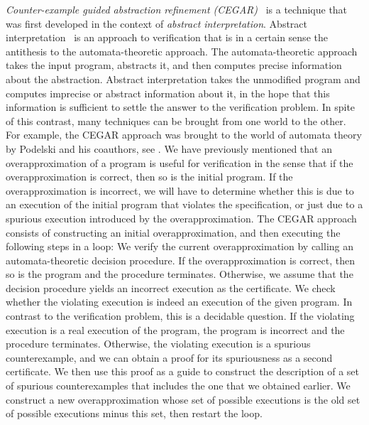 \documentclass[../../diss.tex]{subfiles}
\begin{document}
\emph{Counter-example guided abstraction refinement (CEGAR)}~\cite{ClarkeGJLV00} is a technique that was first developed in the context of \emph{abstract interpretation}.
Abstract interpretation~\cite{CousotC77} is an approach to verification that is in a certain sense the antithesis to the automata-theoretic approach.
The automata-theoretic approach takes the input program, abstracts it, and then computes precise information about the abstraction.
Abstract interpretation takes the unmodified program and computes imprecise or abstract information about it, in the hope that this information is sufficient to settle the answer to the verification problem.
In spite of this contrast, many techniques can be brought from one world to the other.
For example, the CEGAR approach was brought to the world of automata theory by Podelski and his coauthors, see \eg \cite{HeizmannHP10}.
We have previously mentioned that an overapproximation of a program is useful for verification in the sense that if the overapproximation is correct, then so is the initial program.
If the overapproximation is incorrect, we will have to determine whether this is due to an execution of the initial program that violates the specification, or just due to a spurious execution introduced by the overapproximation.
The CEGAR approach consists of constructing an initial overapproximation, and then executing the following steps in a loop:
We verify the current overapproximation by calling an automata-theoretic decision procedure.
If the overapproximation is correct, then so is the program and the procedure terminates.
Otherwise, we assume that the decision procedure yields an incorrect execution as the certificate.
We check whether the violating execution is indeed an execution of the given program.
In contrast to the verification problem, this is a decidable question.
If the violating execution is a real execution of the program, the program is incorrect and the procedure terminates.
Otherwise, the violating execution is a spurious counterexample, and we can obtain a proof for its spuriousness as a second certificate.
We then use this proof as a guide to construct the description of a set of spurious counterexamples that includes the one that we obtained earlier.
We construct a new overapproximation whose set of possible executions is the old set of possible executions minus this set, then restart the loop.
\end{document}

